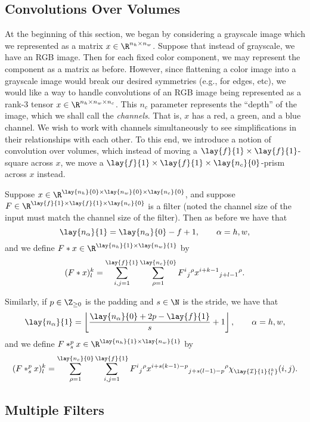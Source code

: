 \subsection{Convolutions Over Volumes}

At the beginning of this section, we began by considering a grayscale image which we represented as a matrix $x\in\R^{n_h\times n_w}$.  Suppose that instead of grayscale, we have an RGB image.  Then for each fixed color component, we may represent the component as a matrix as before.  However, since flattening a color image into a grayscale image would break our desired symmetries (e.g., for edges, etc), we would like a way to handle convolutions of an RGB image being represented as a rank-$3$ tensor $x\in\R^{n_h\times n_w\times n_c}$.  This $n_c$ parameter represents the ``depth'' of the image, which we shall call the \textit{channels}.  That is, $x$ has a red, a green, and a blue channel.  We wish to work with channels simultaneously to see simplifications in their relationships with each other.  To this end, we introduce a notion of convolution over volumes, which instead of moving a $\lay{f}{1}\times\lay{f}{1}$-square across $x$, we move a $\lay{f}{1}\times\lay{f}{1}\times\lay{n_c}{0}$-prism across $x$ instead.

Suppose $x\in\R^{\lay{n_h}{0}\times\lay{n_w}{0}\times\lay{n_c}{0}}$, and suppose $F\in\R^{\lay{f}{1}\times\lay{f}{1}\times\lay{n_c}{0}}$ is a filter (noted the channel size of the input must match the channel size of the filter).  Then as before we have that
$$\lay{n_\alpha}{1}=\lay{n_\alpha}{0}-f+1,\qquad\alpha=h,w,$$
and we define $F*x\in\R^{\lay{n_h}{1}\times\lay{n_w}{1}}$ by
$$(F*x)^k_l=\sum_{i,j=1}^{\lay{f}{1}}\sum_{\rho=1}^{\lay{n_c}{0}}F{^i}{_j}{^\rho}x{^{i+k-1}}{_{j+l-1}}{^\rho}.$$

Similarly, if $p\in\Z_{\geq0}$ is the padding and $s\in\N$ is the stride, we have that
$$\lay{n_\alpha}{1}=\left\lfloor\frac{\lay{n_\alpha}{0}+2p-\lay{f}{1}}{s}+1\right\rfloor,\qquad \alpha=h,w,$$
and we define $F*^p_sx\in\R^{\lay{n_h}{1}\times\lay{n_w}{1}}$ by
$$(F*^p_sx)^k_l=\sum_{\rho=1}^{\lay{n_c}{0}}\sum_{i,j=1}^{\lay{f}{1}}F{^i}{_j}{^\rho}x{^{i+s(k-1)-p}}{_{j+s(l-1)-p}}{^\rho}\chi_{\lay{\mathcal{I}}{1}{^k_l}}(i,j).$$


\subsection{Multiple Filters}

